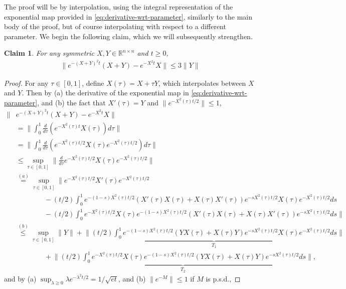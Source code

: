 \documentclass[11pt]{article} %
\newcommand{\R}{\mathbb{R}}
\newcommand{\<}{\langle}
\renewcommand{\>}{\rangle}
\newtheorem{claim}{Claim}
\theoremstyle{plain}
\theoremstyle{definition}
\theoremstyle{remark}
\begin{document}
The proof will be by interpolation, using the integral representation of the exponential map provided in \eqref{eq:derivative-wrt-parameter}, similarly to the main body of the proof, but of course interpolating with respect to a different parameter. We begin the following claim, which we will subsequently strengthen.
\begin{claim}\label{claim:tech-telescope-symm}
For any symmetric $X,Y \in \R^{n \times n}$ and $t \geq 0$,
\begin{align*}
\|e^{-(X+Y)^2 t}(X+Y) - e^{-X^2 t} X\| \leq 3\|Y\|
\end{align*}
\end{claim}
\begin{proof}
For any $\tau \in [0,1]$, define $X(\tau) = X + \tau Y$, which interpolates between $X$ and $Y$.
Then by (a) the derivative of the exponential map in \eqref{eq:derivative-wrt-parameter}, and (b) the fact that $X'(\tau) = Y$ and $\|e^{-X^2(\tau)t/2}\| \leq 1$,
\begin{align*}
\|&e^{-(X+Y)^2 t}(X+Y) - e^{-X^2 t} X\| \\
&= \|\int_{0}^1 \frac{d}{d\tau}\left(e^{-X^2(\tau) t} X(\tau)\right) d\tau\| \\
&= \|\int_{0}^1 \frac{d}{d\tau}\left(e^{-X^2(\tau) t / 2} X(\tau)  e^{-X^2(\tau) t / 2} \right) d\tau\| \\
&\leq \sup_{\tau \in [0,1]} \|\frac{d}{d\tau}  e^{-X^2(\tau) t / 2} X(\tau) e^{-X^2(\tau) t / 2} \| \\
&\stackrel{(a)}{=} \sup_{\tau \in [0,1]} \|e^{-X^2(\tau) t / 2} X'(\tau) e^{-X^2(\tau) t / 2} \\
&\quad\quad\quad\quad - (t/2)\int_{0}^{1} e^{-(1-s)X^2(\tau) t / 2} (X'(\tau) X(\tau) + X(\tau) X'(\tau))  e^{-s X^2(\tau) t / 2} X(\tau) e^{-X^2(\tau) t / 2} ds \\
&\qquad\qquad - (t/2)\int_{0}^{1} e^{-X^2(\tau) t / 2} X(\tau) e^{-(1-s)X^2(\tau) t / 2} (X'(\tau) X(\tau) + X(\tau) X'(\tau)) e^{-sX^2(\tau) t / 2} ds \| \\
&\stackrel{(b)}{\leq} \sup_{\tau \in [0,1]} \|Y\| + \underbrace{\|(t/2)\int_{0}^{1} e^{-(1-s)X^2(\tau) t / 2} (Y X(\tau) + X(\tau) Y)  e^{-s X^2(\tau) t / 2} X(\tau) e^{-X^2(\tau) t / 2} ds\|}_{T_1} \\
&\qquad\qquad + \underbrace{\|(t/2)\int_{0}^{1} e^{-X^2(\tau) t / 2} X(\tau) e^{-(1-s)X^2(\tau) t / 2} (Y X(\tau) + X(\tau) Y) e^{-sX^2(\tau) t / 2} ds \|}_{T_2},
\end{align*}
and by (a) $\sup_{\lambda \geq 0} \lambda e^{-\lambda^2 t / 2} = 1 / \sqrt{e t}$, and (b) $\|e^{-M}\| \leq 1$ if $M$ is p.s.d.,

\end{proof}
\end{document}
